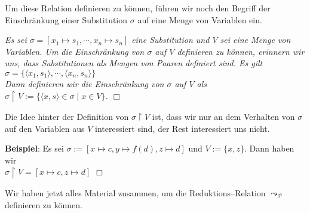 Um diese Relation definieren zu k\"{o}nnen, f\"{u}hren wir noch den Begriff der Einschr\"{a}nkung einer
Substitution $\sigma$ auf eine Menge von Variablen ein.

\begin{Definition}
{\em
  Es sei $\sigma = [ x_1 \mapsto s_1, \cdots, x_n \mapsto s_n ]$ eine Substitution und $V$ sei eine Menge von Variablen.
  Um die Einschr\"{a}nkung von $\sigma$ auf $V$ definieren zu k\"{o}nnen, erinnern wir uns, dass Substitutionen
  als Mengen von Paaren definiert sind.  Es gilt \\[0.1cm]
  \hspace*{1.3cm} $\sigma = \big\{ \langle x_1, s_1 \rangle, \cdots, \langle x_n, s_n \rangle \big\}$ \\[0.1cm]
  Dann definieren wir die \emph{Einschr\"{a}nkung von $\sigma$ auf $V$} als  \\[0.1cm]
  \hspace*{1.3cm} $\sigma \restriction V := \big\{ \langle x, s \rangle\in \sigma \; \big|\; x \in V \big\}$.
  \hspace*{\fill} $\Box$
}
\end{Definition}
Die Idee hinter der Definition von $\sigma\restriction V$ ist, dass wir nur an dem Verhalten von $\sigma$ auf
den Variablen aus $V$ interessiert sind, der Rest interessiert uns nicht.  
\vspace{0.1cm}

\noindent
\textbf{Beispiel}: Es sei $\sigma := [ x \mapsto c, y \mapsto f(d), z \mapsto d ]$ und $V := \{ x, z \}$.
Dann haben wir \\[0.1cm]
\hspace*{1.3cm} $\sigma\restriction V = [ x \mapsto c, z \mapsto d ]$ \hspace*{\fill} $\Box$
\vspace{0.1cm}

Wir haben jetzt alles Material
zusammen, um die Reduktions--Relation $\leadsto_\mathcal{P}$ definieren zu k\"{o}nnen.

